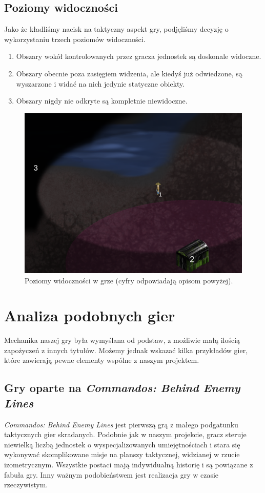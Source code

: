 \documentclass[licencjacka]{pracamgr}
\begin{document}
    \subsection{Poziomy widoczności}
      Jako że kładliśmy nacisk na taktyczny aspekt gry, podjęliśmy decyzję o wykorzystaniu trzech poziomów widoczności. 
      \begin{enumerate}
       \item Obszary wokół kontrolowanych przez gracza jednostek są doskonale widoczne.
       \item Obszary obecnie poza zasięgiem widzenia, ale kiedyś już odwiedzone, są wyszarzone i widać na nich jedynie statyczne obiekty.
       \item Obszary nigdy nie odkryte są kompletnie niewidoczne.
      \end{enumerate}

      \begin{figure}[htbp]
	\centering
	\includegraphics[scale=0.4]{fow.png}
	\caption{Poziomy widoczności w grze (cyfry odpowiadają opisom powyżej).}
      \end{figure}

  \section{Analiza podobnych gier}
    Mechanika naszej gry była wymyślana od podstaw, z możliwie małą ilością zapożyczeń z innych tytułów. Możemy jednak wskazać
    kilka przykładów gier, które zawierają pewne elementy wspólne z naszym projektem.
    \subsection{Gry oparte na \emph{Commandos: Behind Enemy Lines}}
      \emph{Commandos: Behind Enemy Lines} jest pierwszą grą z małego podgatunku taktycznych gier skradanych. Podobnie jak
      w naszym projekcie, gracz steruje niewielką liczbą jednostek o wyspecjalizowanych umiejętnościach i stara się wykonywać skomplikowane
      misje na planszy taktycznej, widzianej w rzucie izometrycznym. Wszystkie postaci mają indywidualną historię i są powiązane
      z fabuła gry. Inny ważnym podobieństwem jest realizacja gry w czasie rzeczywistym.
\end{document}

